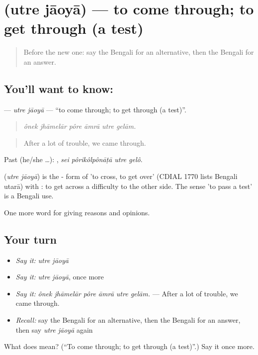\section[\texorpdfstring{\bn{উতরে} \bn{যাওয়া} (utre jāoyā)}{উতরে যাওয়া (utre jāoyā)}]{  (utre jāoyā) — to come through; to get through (a test)}

\label{lesson:BN-C363-utre-jaoya}



\begin{quote}
Before the new one: say the Bengali for an alternative, then the Bengali for an answer.
\end{quote}

\subsection*{You'll want to know:  }
\textbf{ } — \emph{utre jāoyā} — \textquotedblleft{}to come through; to get through (a test)\textquotedblright{}.

\begin{quote}
     
\end{quote}

\begin{quote}
\emph{ônek jhāmelār pôre āmrā utre gelām.}
\end{quote}

\begin{quote}
After a lot of trouble, we came through.
\end{quote}

Past (he/she …):    , \emph{sei pôrikôlpônāṭā utre gelô}.

\begin{cousinweb}
\textbf{ } (\emph{utre jāoyā}) is the - form of  'to cross, to get over' (CDIAL 1770 lists Bengali utarā) with : to get across a difficulty to the other side. The sense 'to pass a test' is a Bengali use.
\end{cousinweb}

\begin{grammarlens}[title={What you've built}]
One more word for giving reasons and opinions.
\end{grammarlens}

\subsection*{Your turn}
\begin{itemize}
\raggedright
  \item \emph{Say it:} \emph{utre jāoyā}
  \item \emph{Say it:} \emph{utre jāoyā}, once more
  \item \emph{Say it:} \emph{ônek jhāmelār pôre āmrā utre gelām.} — After a lot of trouble, we came through.
  \item \emph{Recall:} say the Bengali for an alternative, then the Bengali for an answer, then say \emph{utre jāoyā} again
\end{itemize}

\begin{tcolorbox}[breakable,colback=teal!4,colframe=teal!35!black,title={Before you move on}]
What does   mean? (\textquotedblleft{}To come through; to get through (a test)\textquotedblright{}.) Say it once more.
\end{tcolorbox}

